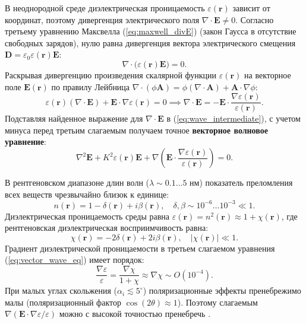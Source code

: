 \documentclass[a4paper,11pt]{article}
\begin{document}
В неоднородной среде диэлектрическая проницаемость $\varepsilon(\mathbf{r})$ зависит от координат, поэтому дивергенция электрического поля $\nabla \cdot \mathbf{E} \neq 0$. Согласно третьему уравнению Максвелла (\ref{eq:maxwell_divE}) (закон Гаусса в отсутствие свободных зарядов), нулю равна дивергенция вектора электрического смещения $\mathbf{D} = \varepsilon_0 \varepsilon(\mathbf{r}) \mathbf{E}$:
\begin{equation}
    \nabla \cdot \big(\varepsilon(\mathbf{r}) \mathbf{E}\big) = 0.
\end{equation}
Раскрывая дивергенцию произведения скалярной функции $\varepsilon(\mathbf{r})$ на векторное поле $\mathbf{E}(\mathbf{r})$ по правилу Лейбница $\nabla \cdot (\phi \mathbf{A}) = \phi (\nabla \cdot \mathbf{A}) + \mathbf{A} \cdot \nabla \phi$:
\begin{equation}
    \varepsilon(\mathbf{r}) (\nabla \cdot \mathbf{E}) + \mathbf{E} \cdot \nabla \varepsilon(\mathbf{r}) = 0 \implies \nabla \cdot \mathbf{E} = - \mathbf{E} \cdot \frac{\nabla \varepsilon(\mathbf{r})}{\varepsilon(\mathbf{r})}.
\end{equation}
Подставляя найденное выражение для $\nabla \cdot \mathbf{E}$ в (\ref{eq:wave_intermediate}), с учетом минуса перед третьим слагаемым получаем точное \textbf{векторное волновое уравнение}:
\begin{equation}
    \nabla^2 \mathbf{E} + K^2 \varepsilon(\mathbf{r}) \mathbf{E} + \nabla \left( \mathbf{E} \cdot \frac{\nabla \varepsilon(\mathbf{r})}{\varepsilon(\mathbf{r})} \right) = 0.
    \label{eq:vector_wave_eq}
\end{equation}

\begin{mathbox}
В рентгеновском диапазоне длин волн ($\lambda \sim 0.1\dots 5$ нм) показатель преломления всех веществ чрезвычайно близок к единице:
\begin{equation}
    n(\mathbf{r}) = 1 - \delta(\mathbf{r}) + i \beta(\mathbf{r}), \quad \delta, \beta \sim 10^{-6}\dots 10^{-3} \ll 1.
\end{equation}
Диэлектрическая проницаемость среды равна $\varepsilon(\mathbf{r}) = n^2(\mathbf{r}) \approx 1 + \chi(\mathbf{r})$, где рентгеновская диэлектрическая восприимчивость равна:
\begin{equation}
    \chi(\mathbf{r}) = -2\delta(\mathbf{r}) + 2i\beta(\mathbf{r}), \quad |\chi(\mathbf{r})| \ll 1.
\end{equation}
Градиент диэлектрической проницаемости в третьем слагаемом уравнения (\ref{eq:vector_wave_eq}) имеет порядок:
\begin{equation}
    \frac{\nabla \varepsilon}{\varepsilon} = \frac{\nabla \chi}{1 + \chi} \approx \nabla \chi \sim O(10^{-4}).
\end{equation}
При малых углах скольжения ($\alpha_i \lesssim 5^\circ$) поляризационные эффекты пренебрежимо малы (поляризационный фактор $\cos(2\theta) \approx 1$). Поэтому слагаемым $\nabla(\mathbf{E} \cdot \nabla \varepsilon / \varepsilon)$ можно с высокой точностью пренебречь \cite{nikolaev2020, mikulik_rcwa}.
\end{mathbox}
\end{document}
